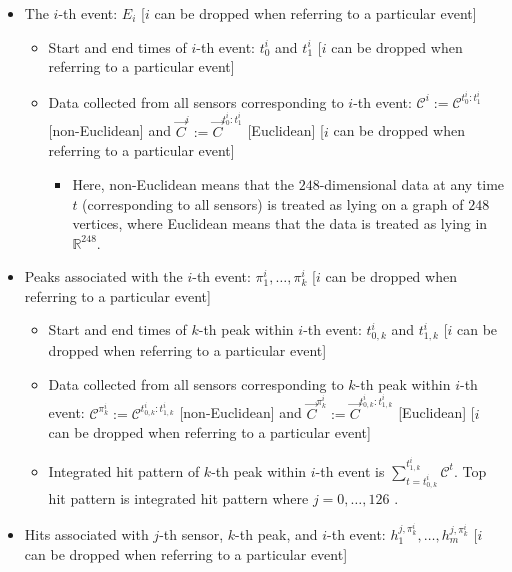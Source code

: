 \documentclass[]{article}
\providecommand{\tightlist}{%
  \setlength{\itemsep}{0pt}\setlength{\parskip}{0pt}}
\begin{document}
\begin{itemize}
\tightlist
\item
  The \(i\)-th event: \(E_i\) {[}\(i\) can be dropped when referring to a particular event{]}

  \begin{itemize}
  \tightlist
  \item
    Start and end times of \(i\)-th event:
    \(t_0^i\) and \(t_1^i\) {[}\(i\) can be dropped when referring to a particular event{]}
  \item
    Data collected from all sensors corresponding to \(i\)-th event:
    \(\mathcal{C}^i := \mathcal{C}^{t_0^i:t_1^i}\) {[}non-Euclidean{]} and
    \(\vec{C}^i := \vec{C}^{t_0^i:t_1^i}\)
    {[}Euclidean{]} {[}\(i\) can be dropped when referring to a particular event{]}

    \begin{itemize}
    \tightlist
    \item
      Here, non-Euclidean means that the \(248\)-dimensional data at any time \(t\) (corresponding to all sensors) is treated as lying on a graph of \(248\) vertices, where Euclidean means that the data is treated as lying in \(\mathbb{R}^{248}\).
    \end{itemize}
  \end{itemize}
\item
  Peaks associated with the \(i\)-th event:
  \(\pi_1^i, \dots, \pi_k^i\) {[}\(i\) can be dropped when referring to a particular event{]}

  \begin{itemize}
  \tightlist
  \item
    Start and end times of \(k\)-th peak within \(i\)-th event:
    \(t_{0,k}^i\) and \(t_{1,k}^i\)
    {[}\(i\) can be dropped when referring to a particular event{]}
  \item
    Data collected from all sensors corresponding to \(k\)-th peak within \(i\)-th event:
    \(\mathcal{C}^{\pi_k^i} := \mathcal{C}^{t_{0,k}^i:t_{1,k}^i}\) {[}non-Euclidean{]} and
    \(\vec{C}^{\pi_k^i} := \vec{C}^{t_{0,k}^i:t_{1,k}^i}\) {[}Euclidean{]}
    {[}\(i\) can be dropped when referring to a particular event{]}
  \item
    Integrated hit pattern of \(k\)-th peak within \(i\)-th event is $\sum_{t=t_{0,k}^i}^{t_{1,k}^i}$\(\mathcal{C}^t\). Top hit pattern is integrated hit pattern where \(j = 0,\dots,126\) .
  \end{itemize}
\item
  Hits associated with \(j\)-th sensor, \(k\)-th peak, and \(i\)-th event:
  \(h_1^{j,\pi_k^i}, \dots, h_m^{j,\pi_k^i}\) {[}\(i\) can be dropped when referring to a particular event{]}
\end{itemize}
\end{document}
